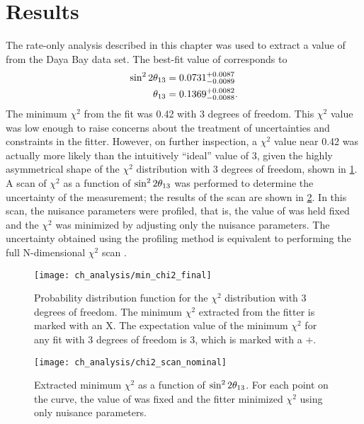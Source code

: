 \section{Results}
\label{sec:results}

The rate-only analysis described in this chapter
was used to extract a value of \thetaot{}
from the Daya Bay data set.
The best-fit value of \thetaot{} corresponds to
\begin{align}\label{eq:result}
    \begin{split}
        \sin^22\theta_{13} &= 0.0731^{+0.0087}_{-0.0089}\\
        \theta_{13} &= 0.1369^{+0.0082}_{-0.0088}.
    \end{split}
\end{align}
The minimum $\chi^2$ from the fit was 0.42 with 3 degrees of freedom.
This $\chi^2$ value was low enough to raise concerns
about the treatment of uncertainties and constraints in the fitter.
However, on further inspection, a $\chi^2$ value near 0.42
was actually more likely than the intuitively ``ideal'' value of 3,
given the highly asymmetrical shape
of the $\chi^2$ distribution with 3 degrees of freedom,
shown in \cref{fig:chi2_pdf}.
A scan of $\chi^2$ as a function of $\sin^22\theta_{13}$
was performed to determine the uncertainty of the measurement;
the results of the scan are shown in \cref{fig:chi2_scan}.
In this scan, the nuisance parameters were profiled,
that is, the value of \thetaot{} was held fixed
and the $\chi^2$ was minimized by adjusting only the nuisance parameters.
The uncertainty obtained using the profiling method
is equivalent to performing the full N-dimensional $\chi^2$ scan \cite{pdg}.

\begin{figure}
    \centering
    \texttt{[image: ch\_analysis/min\_chi2\_final]}
    \caption{
        Probability distribution function for the $\chi^2$ distribution
        with 3 degrees of freedom.
        The minimum $\chi^2$ extracted from the fitter
        is marked with an X.
        The expectation value of the minimum $\chi^2$
        for any fit with 3 degrees of freedom is 3,
        which is marked with a $+$.
    }
    \label{fig:chi2_pdf}
\end{figure}

\begin{figure}
    \centering
    \texttt{[image: ch\_analysis/chi2\_scan\_nominal]}
    \caption{
        Extracted minimum $\chi^2$ as a function of $\sin^22\theta_{13}$.
        For each point on the curve, the value of \thetaot{} was fixed
        and the fitter minimized $\chi^2$
        using only nuisance parameters.
    }
    \label{fig:chi2_scan}
\end{figure}


